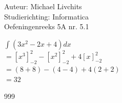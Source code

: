 \documentclass[a4paper]{article}
\begin{document}
  
\noindent \large Auteur: Michael Livchits \\
\noindent \large Studierichting:  Informatica\\
\noindent \large Oefeningenreeks 5A nr. 5.1\\

\medskip

\normalsize

$ \displaystyle\int (3x^2-2x+4)dx$\\

$= \left[x^3\right]_{-2}^{2} - \left[x^2\right]_{-2}^{2} + 4\left[x\right]_{-2}^{2}$\\

$= (8+8) - (4-4) + 4(2+2)$\\

$= 32$\\

\begin{thebibliography}{999}
\end{thebibliography}
\end{document}
